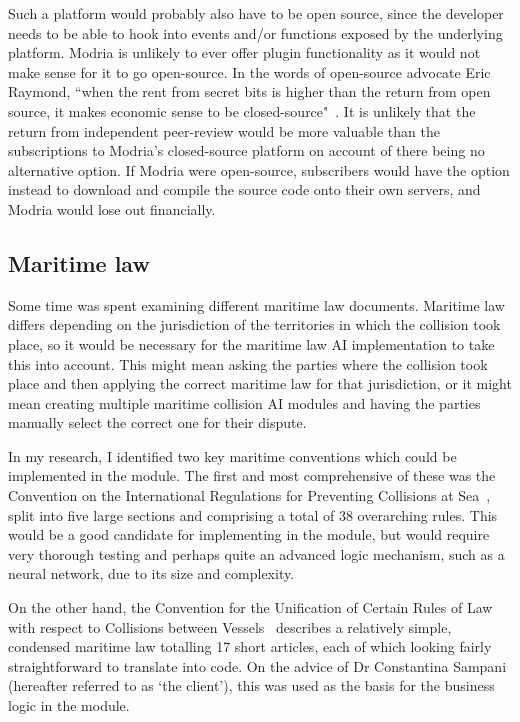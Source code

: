 Such a platform would probably also have to be open source, since the developer needs to be able to hook into events and/or functions exposed by the underlying platform. Modria is unlikely to ever offer plugin functionality as it would not make sense for it to go open-source. In the words of open-source advocate Eric Raymond, ``when the rent from secret bits is higher than the return from open source, it makes economic sense to be closed-source"~\cite{eric:catB}. It is unlikely that the return from independent peer-review would be more valuable than the subscriptions to Modria's closed-source platform on account of there being no alternative option. If Modria were open-source, subscribers would have the option instead to download and compile the source code onto their own servers, and Modria would lose out financially.

\subsection{Maritime law}

Some time was spent examining different maritime law documents. Maritime law differs depending on the jurisdiction of the territories in which the collision took place, so it would be necessary for the maritime law AI implementation to take this into account. This might mean asking the parties where the collision took place and then applying the correct maritime law for that jurisdiction, or it might mean creating multiple maritime collision AI modules and having the parties manually select the correct one for their dispute.

In my research, I identified two key maritime conventions which could be implemented in the module. The first and most comprehensive of these was the Convention on the International Regulations for Preventing Collisions at Sea~\cite{law:long}, split into five large sections and comprising a total of 38 overarching rules. This would be a good candidate for implementing in the module, but would require very thorough testing and perhaps quite an advanced logic mechanism, such as a neural network, due to its size and complexity.

On the other hand, the Convention for the Unification of Certain Rules of Law with respect to Collisions between Vessels~\cite{law:short} describes a relatively simple, condensed maritime law totalling 17 short articles, each of which looking fairly straightforward to translate into code. On the advice of Dr Constantina Sampani (hereafter referred to as `the client'), this was used as the basis for the business logic in the module.


